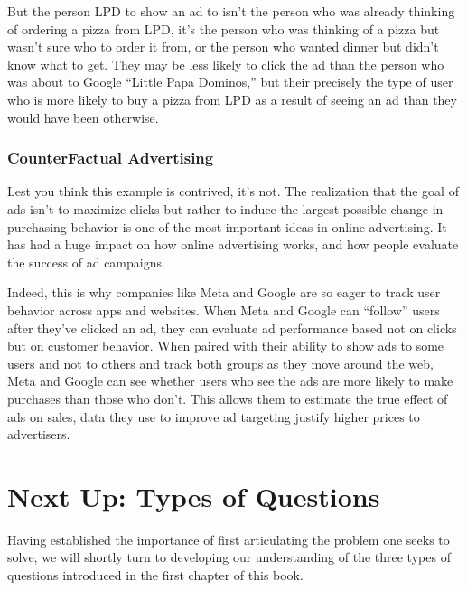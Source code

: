 \documentclass[letterpaper,10pt,english]{jupyterBook}
\begin{document}
\sphinxAtStartPar
But the person LPD  to show an ad to isn’t the person who was already thinking of ordering a pizza from LPD, it’s the person who was thinking of a pizza but wasn’t sure who to order it from, or the person who wanted dinner but didn’t know what to get. They may be less likely to click the ad than the person who was about to Google “Little Papa Dominos,” but their precisely the type of user who is more likely to buy a pizza from LPD as a result of seeing an ad than they would have been otherwise.


\subsubsection{Counter\sphinxhyphen{}Factual Advertising}
\label{\detokenize{10_introduction/30_solving_the_right_problem:counter-factual-advertising}}
\sphinxAtStartPar
Lest you think this example is contrived, it’s not. The realization that the goal of ads isn’t to maximize clicks but rather to induce the largest possible change in purchasing behavior is one of the most important ideas in online advertising. It has had a huge impact on how online advertising works, and how people evaluate the success of ad campaigns.

\sphinxAtStartPar
Indeed, this is why companies like Meta and Google are so eager to track user behavior across apps and websites. When Meta and Google can “follow” users after they’ve clicked an ad, they can evaluate ad performance based not on clicks but on customer behavior. When paired with their ability to show ads to some users and not to others and track both groups as they move around the web, Meta and Google can see whether users who see the ads are more likely to make purchases than those who don’t. This allows them to estimate the true effect of ads on sales, data they use to improve ad targeting  justify higher prices to advertisers.


\section{Next Up: Types of Questions}
\label{\detokenize{10_introduction/30_solving_the_right_problem:next-up-types-of-questions}}
\sphinxAtStartPar
Having established the importance of first articulating the problem one seeks to solve, we will shortly turn to developing our understanding of the three types of questions introduced in the first chapter of this book.
\end{document}
